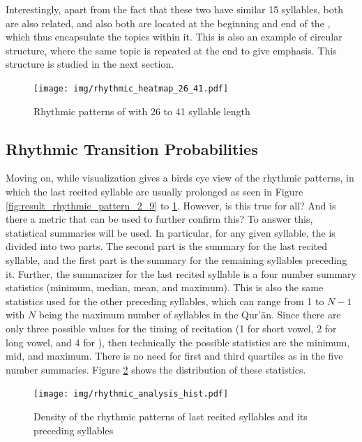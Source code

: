 Interestingly, apart from the fact that these two   have similar 15 syllables, both are also related, and also both are located at the beginning and end of the  , which thus encapsulate the topics within it. This is also an example of circular structure, where the same topic is repeated at the end to give emphasis. This structure is studied in the next section.

\begin{figure}[!t]
    \centering
    \texttt{[image: img/rhythmic\_heatmap\_26\_41.pdf]}
    \caption{Rhythmic patterns of   with 26 to 41 syllable length}
    \label{fig:result_rhythmic_pattern_26_41}
\end{figure}

\subsection{Rhythmic Transition Probabilities}
Moving on, while visualization gives a birds eye view of the rhythmic patterns, in which the last recited syllable are usually prolonged as seen in Figure \ref{fig:result_rhythmic_pattern_2_9} to \ref{fig:result_rhythmic_pattern_26_41}. However, is this true for all? And is there a metric that can be used to further confirm this? To answer this, statistical summaries will be used. In particular, for any given syllable, the   is divided into two parts. The second part is the summary for the last recited syllable, and the first part is the summary for the remaining syllables preceding it. Further, the summarizer for the last recited syllable is a four number summary statistics (minimum, median, mean, and maximum). This is also the same statistics used for the other preceding syllables, which can range from 1 to $N-1$ with $N$ being the maximum number of syllables in the Qur'\=an. Since there are only three possible values for the timing of recitation (1 for short vowel, 2 for long vowel, and 4 for  ), then technically the possible statistics are the minimum, mid, and maximum. There is no need for first and third quartiles as in the five number summaries. Figure \ref{fig:result_rhythmic_hist} shows the distribution of these statistics.

\begin{figure}[!t]
    \centering
    \texttt{[image: img/rhythmic\_analysis\_hist.pdf]}
    \caption{Density of the rhythmic patterns of last recited syllables and its preceding syllables}
    \label{fig:result_rhythmic_hist}
\end{figure}

